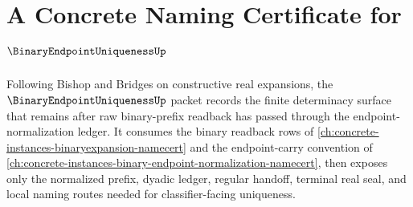 \chapter{A Concrete Naming Certificate for $\BinaryEndpointUniquenessUp$}
\label{ch:concrete-instances-binary-endpoint-uniqueness-namecert}

Following Bishop and Bridges on constructive real expansions, the $\BinaryEndpointUniquenessUp$ packet records the finite determinacy surface that remains after raw binary-prefix readback has passed through the endpoint-normalization ledger. It consumes the binary readback rows of \autoref{ch:concrete-instances-binaryexpansion-namecert} and the endpoint-carry convention of \autoref{ch:concrete-instances-binary-endpoint-normalization-namecert}, then exposes only the normalized prefix, dyadic ledger, regular handoff, terminal real seal, and local naming routes needed for classifier-facing uniqueness.


